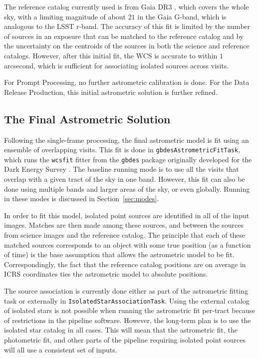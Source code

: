 \documentclass[DM,authoryear,toc]{lsstdoc}
\begin{document}
The reference catalog currently used is from Gaia DR3 \citep{2023A&A...674A...1G}, which covers the whole sky, with a limiting magnitude of about $21$ in the Gaia G-band, which is analogous to the LSST r-band. The accuracy of this fit is limited by the number of sources in an exposure that can be matched to the reference catalog and by the uncertainty on the centroids of the sources in both the science and reference catalogs. However, after this initial fit, the WCS is accurate to within $1$ arcsecond, which is sufficient for associating isolated sources across visits.

For Prompt Processing, no further astrometric calibration is done. For the Data Release Production, this initial astrometric solution is further refined.

\subsection{The Final Astrometric Solution}\label{sec:final}
Following the single-frame processing, the final astrometric model is fit using an ensemble of overlapping visits. This fit is done in \texttt{gbdesAstrometricFitTask}, which runs the \texttt{wcsfit} fitter from the \texttt{gbdes} package originally developed for the Dark Energy Survey \citep{2017PASP..129g4503B}. The baseline running mode is to use all the visits that overlap with a given tract of the sky in one band. However, this fit can also be done using multiple bands and larger areas of the sky, or even globally. Running in these modes is discussed in Section~\ref{sec:modes}.

In order to fit this model, isolated point sources are identified in all of the input images. Matches are then made among these sources, and between the sources from science images and the reference catalog. The principle that each of these matched sources corresponds to an object with some true position (as a function of time) is the base assumption that allows the astrometric model to be fit. Correspondingly, the fact that the reference catalog positions are on average in ICRS coordinates ties the astrometric model to absolute positions.

The source association is currently done either as part of the astrometric fitting task or externally in \texttt{IsolatedStarAssociationTask}. Using the external catalog of isolated stars is not possible when running the astrometric fit per-tract because of restrictions in the pipeline software. However, the long-term plan is to use the isolated star catalog in all cases. This will mean that the astrometric fit, the photometric fit, and other parts of the pipeline requiring isolated point sources will all use a consistent set of inputs.
\end{document}
